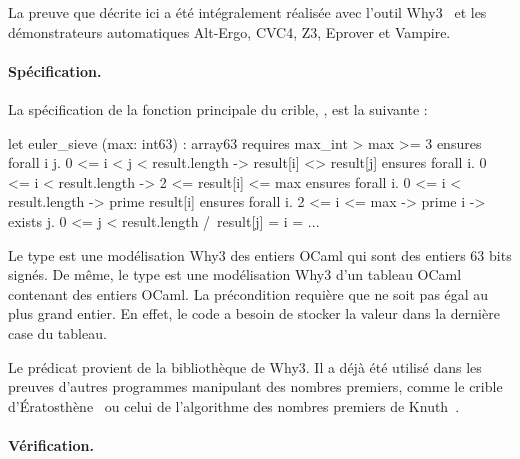 \documentclass[a4paper]{easychair}
\begin{document}
La preuve que décrite ici a été intégralement réalisée avec l'outil
Why3~\cite{why3} et les démonstrateurs automatiques Alt-Ergo, CVC4, Z3, Eprover
et Vampire. %

\clearpage
\paragraph{Spécification.}
La spécification de la fonction principale du crible,
, est la suivante :

\begin{why3}
let euler_sieve (max: int63) : array63
  requires { max_int > max >= 3 }
  ensures  { forall i j. 0 <= i < j < result.length -> result[i] <> result[j] }
  ensures  { forall i. 0 <= i < result.length -> 2 <= result[i] <= max }
  ensures  { forall i. 0 <= i < result.length -> prime result[i] }
  ensures  { forall i. 2 <= i <= max -> prime i ->
                       exists j. 0 <= j < result.length /\ result[j] = i }
= ...
\end{why3}

Le type  est une modélisation Why3 des entiers OCaml qui sont
des entiers 63 bits signés. De même, le type  est une
modélisation Why3 d'un tableau OCaml contenant des entiers OCaml.
La précondition requière que  ne soit pas égal au plus grand
entier. En effet, le code a besoin de stocker la valeur 
dans la dernière case du tableau.

Le prédicat  provient de la bibliothèque 
de Why3. Il a déjà été utilisé dans les preuves d'autres programmes
manipulant des nombres premiers, comme le crible
d'Ératosthène~\cite{sieve-eratosthene-why3} ou celui de l'algorithme
des nombres premiers de Knuth~\cite{knuth-prime-numbers,knuth-prime-numbers-why3}.

\clearpage
\paragraph{Vérification.}
\end{document}
